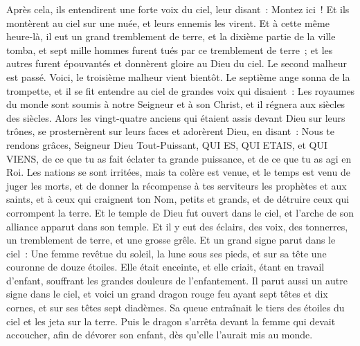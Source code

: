 \begin{multicols}{2}
Après cela, ils entendirent une forte voix du ciel, leur disant~: Montez ici~! Et ils montèrent au ciel sur une nuée, et leurs ennemis les virent.
Et à cette même heure-là, il eut un grand tremblement de terre, et la dixième partie de la ville tomba, et sept mille hommes furent tués par ce tremblement de terre~; et les autres furent épouvantés et donnèrent gloire au Dieu du ciel.
Le second malheur est passé. Voici, le troisième malheur vient bientôt.
Le septième ange sonna de la trompette, et il se fit entendre au ciel de grandes voix qui disaient~: Les royaumes du monde sont soumis à notre Seigneur et à son Christ, et il régnera aux siècles des siècles.
Alors les vingt-quatre anciens qui étaient assis devant Dieu sur leurs trônes, se prosternèrent sur leurs faces et adorèrent Dieu,
en disant~: Nous te rendons grâces, Seigneur Dieu Tout-Puissant, QUI ES, QUI ETAIS, et QUI VIENS, de ce que tu as fait éclater ta grande puissance, et de ce que tu as agi en Roi.
Les nations se sont irritées, mais ta colère est venue, et le temps est venu de juger les morts, et de donner la récompense à tes serviteurs les prophètes et aux saints, et à ceux qui craignent ton Nom, petits et grands, et de détruire ceux qui corrompent la terre.
Et le temple de Dieu fut ouvert dans le ciel, et l'arche de son alliance apparut dans son temple. Et il y eut des éclairs, des voix, des tonnerres, un tremblement de terre, et une grosse grêle.
\VerseOne{}Et un grand signe parut dans le ciel~: Une femme revêtue du soleil, la lune sous ses pieds, et sur sa tête une couronne de douze étoiles.
Elle était enceinte, et elle criait, étant en travail d'enfant, souffrant les grandes douleurs de l'enfantement.
Il parut aussi un autre signe dans le ciel, et voici un grand dragon rouge feu ayant sept têtes et dix cornes, et sur ses têtes sept diadèmes.
Sa queue entraînait le tiers des étoiles du ciel et les jeta sur la terre. Puis le dragon s'arrêta devant la femme qui devait accoucher, afin de dévorer son enfant, dès qu'elle l'aurait mis au monde.

\end{multicols}
